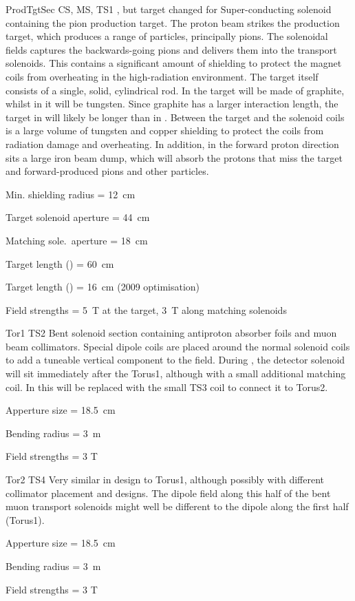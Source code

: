 {ProdTgtSec}
{CS, MS, TS1}
{\phaseI, but target changed for \phaseII}
{Super-conducting solenoid containing the pion production target.
  The proton beam strikes the production target, which produces a range of particles, principally pions.
  The solenoidal fields captures the backwards-going pions and delivers them into the transport solenoids.
  This contains a significant amount of shielding to protect the magnet coils from overheating in the high-radiation environment.
  The target itself consists of a single, solid, cylindrical rod.
  In \phaseI the target will be made of graphite, whilst in \phaseII it will be tungsten.
 Since graphite has a larger interaction length, the target in \phaseI will likely be longer than in \phaseII.
Between the target and the solenoid coils is a large volume of tungsten and copper shielding to protect the coils from radiation damage and overheating.
In addition, in the forward proton direction sits a large iron beam dump, which will absorb the protons that miss the target and forward-produced pions and other particles.
}
{\item Min. shielding radius = 12~cm%
 \item Target solenoid aperture = 44~cm%
 \item Matching sole.\ aperture = 18~cm%
 \item Target length (\phaseI) = 60~cm%
 \item Target length (\phaseII) = 16~cm (2009 optimisation)%
 \item Field strengths = 5~T at the target, 3~T along matching solenoids}

{Tor1}
{TS2}
{\phaseI }
{Bent solenoid section containing antiproton absorber foils and muon beam collimators.  Special dipole coils are placed around the normal solenoid coils to add a tuneable vertical component to the field.  During \phaseI, the detector solenoid will sit immediately after the Torus1, although with a small additional matching coil.  In \phaseII this will be replaced with the small TS3 coil to connect it to Torus2.}
{\item Apperture size = 18.5~cm
 \item Bending radius = 3~m 
\item Field strengths = 3 T}

{Tor2}
{TS4}
{\phaseII}
{Very similar in design to Torus1, although possibly with different collimator placement and designs. The dipole field along this half of the bent muon transport solenoids might well be different to the dipole along the first half (Torus1).}
{\item Apperture size = 18.5~cm
 \item Bending radius = 3~m
 \item Field strengths = 3 T}

